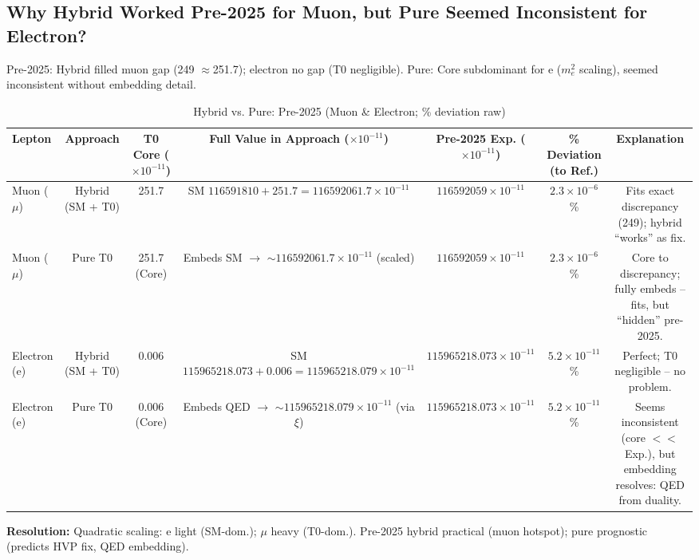 \documentclass[12pt,a4paper]{article}
\begin{document}
	\subsection{Why Hybrid Worked Pre-2025 for Muon, but Pure Seemed Inconsistent for Electron?}
	
	Pre-2025: Hybrid filled muon gap (249 $\approx$251.7); electron no gap (T0 negligible). Pure: Core subdominant for e ($m_e^2$ scaling), seemed inconsistent without embedding detail.
	
	\begin{table}[ht!]
		\centering
		\small
		\begin{adjustbox}{max width=\textwidth}
			\begin{tabular}{lcccccc}
				\toprule
				Lepton & Approach & T0 Core ($ \times 10^{-11}$) & Full Value in Approach ($ \times 10^{-11}$) & Pre-2025 Exp. ($ \times 10^{-11}$) & \% Deviation (to Ref.) & Explanation \\
				\midrule
				Muon ($\mu$) & Hybrid (SM + T0) & 251.7 & SM $116591810 + 251.7 = 116592061.7 \times 10^{-11}$ & $116592059 \times 10^{-11}$ & $2.3 \times 10^{-6}$ \% & Fits exact discrepancy (249); hybrid ``works'' as fix. \\
				Muon ($\mu$) & Pure T0 & 251.7 (Core) & Embeds SM $\to$ $\sim 116592061.7 \times 10^{-11}$ (scaled) & $116592059 \times 10^{-11}$ & $2.3 \times 10^{-6}$ \% & Core to discrepancy; fully embeds -- fits, but ``hidden'' pre-2025. \\
				Electron (e) & Hybrid (SM + T0) & 0.006 & SM $115965218.073 + 0.006 = 115965218.079 \times 10^{-11}$ & $115965218.073 \times 10^{-11}$ & $5.2 \times 10^{-11}$ \% & Perfect; T0 negligible -- no problem. \\
				Electron (e) & Pure T0 & 0.006 (Core) & Embeds QED $\to$ $\sim 115965218.079 \times 10^{-11}$ (via $\xi$) & $115965218.073 \times 10^{-11}$ & $5.2 \times 10^{-11}$ \% & Seems inconsistent (core $<<$ Exp.), but embedding resolves: QED from duality. \\
				\bottomrule
			\end{tabular}
		\end{adjustbox}
		\caption{Hybrid vs. Pure: Pre-2025 (Muon \& Electron; \% deviation raw)}
		\label{tab:hybrid_inconsistency}
	\end{table}
	
	\textbf{Resolution:} Quadratic scaling: e light (SM-dom.); $\mu$ heavy (T0-dom.). Pre-2025 hybrid practical (muon hotspot); pure prognostic (predicts HVP fix, QED embedding).
	
\end{document}
